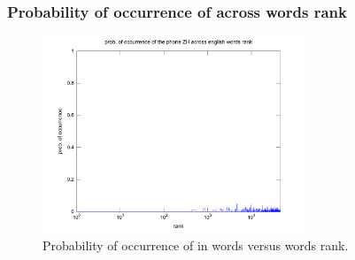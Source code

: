 \documentclass{beamer}
\begin{document}
\frame
{
  \frametitle{Probability of occurrence of \textipa{[Z]} across words rank}
\begin{figure}[h!]
\centering
\includegraphics[width=0.7\textwidth]{images/proboccwordsphone_ZH.pdf}
\caption{Probability of occurrence of \textipa{[Z]} in words versus words rank.}
\label{fig:proboccwordsphone_ZH}
\end{figure} 
}
\end{document}
